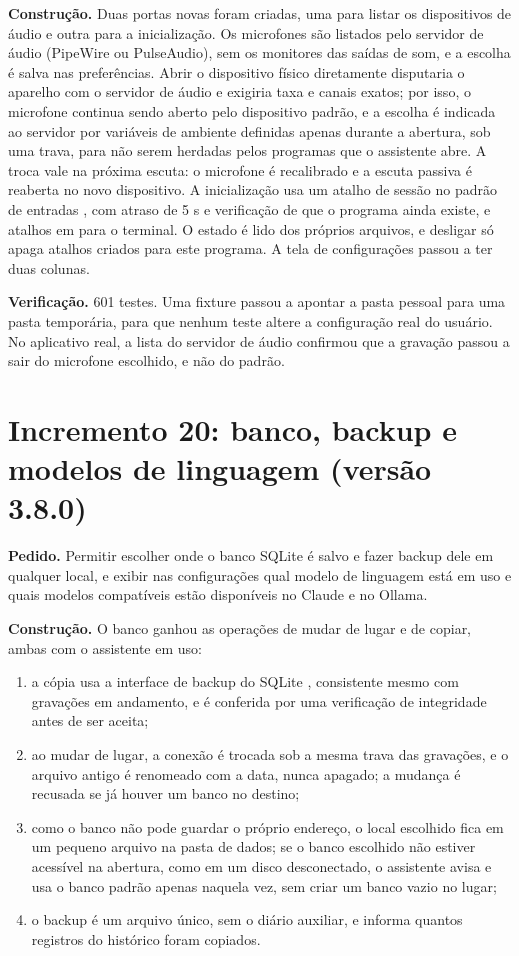 \textbf{Construção.} Duas portas novas foram criadas, uma para listar os dispositivos de áudio e outra
para a inicialização. Os microfones são listados pelo servidor de áudio (PipeWire \cite{pipewire} ou
PulseAudio), sem os monitores das saídas de som, e a escolha é salva nas preferências. Abrir o
dispositivo físico diretamente disputaria o aparelho com o servidor de áudio e exigiria taxa e canais
exatos; por isso, o microfone continua sendo aberto pelo dispositivo padrão, e a escolha é indicada ao
servidor por variáveis de ambiente definidas apenas durante a abertura, sob uma trava, para não serem
herdadas pelos programas que o assistente abre. A troca vale na próxima escuta: o microfone é
recalibrado e a escuta passiva é reaberta no novo dispositivo. A inicialização usa um atalho de sessão
no padrão de entradas  \cite{freedesktop}, com atraso de 5 s e verificação de que o
programa ainda existe, e atalhos em  para o terminal. O estado é lido dos próprios
arquivos, e desligar só apaga atalhos criados para este programa. A tela de configurações passou a ter
duas colunas.

\textbf{Verificação.} 601 testes. Uma fixture passou a apontar a pasta pessoal para uma pasta
temporária, para que nenhum teste altere a configuração real do usuário. No aplicativo real, a lista
do servidor de áudio confirmou que a gravação passou a sair do microfone escolhido, e não do padrão.

\section{Incremento 20: banco, backup e modelos de linguagem (versão 3.8.0)}

\textbf{Pedido.} Permitir escolher onde o banco SQLite é salvo e fazer backup dele em qualquer local, e
exibir nas configurações qual modelo de linguagem está em uso e quais modelos compatíveis estão
disponíveis no Claude e no Ollama.

\textbf{Construção.} O banco ganhou as operações de mudar de lugar e de copiar, ambas com o assistente
em uso:
\begin{enumerate}[label=\alph*)]
  \item a cópia usa a interface de backup do SQLite \cite{sqlite}, consistente mesmo com gravações em
        andamento, e é conferida por uma verificação de integridade antes de ser aceita;
  \item ao mudar de lugar, a conexão é trocada sob a mesma trava das gravações, e o arquivo antigo é
        renomeado com a data, nunca apagado; a mudança é recusada se já houver um banco no destino;
  \item como o banco não pode guardar o próprio endereço, o local escolhido fica em um pequeno arquivo
        na pasta de dados; se o banco escolhido não estiver acessível na abertura, como em um disco
        desconectado, o assistente avisa e usa o banco padrão apenas naquela vez, sem criar um banco
        vazio no lugar;
  \item o backup é um arquivo único, sem o diário auxiliar, e informa quantos registros do histórico
        foram copiados.
\end{enumerate}

